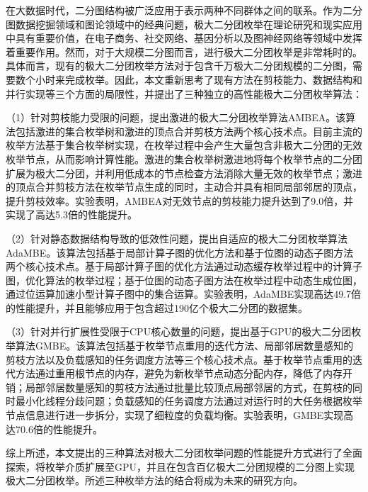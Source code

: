 \cleardoublepage
{}

在大数据时代，二分图结构被广泛应用于表示两种不同群体之间的联系。作为二分图数据挖掘领域和图论领域中的经典问题，极大二分团枚举在理论研究和现实应用中具有重要价值，在电子商务、社交网络、基因分析以及图神经网络等领域中发挥着重要作用。然而，对于大规模二分图而言，进行极大二分团枚举是非常耗时的。具体而言，现有的极大二分团枚举方法对于包含千万极大二分团规模的二分图，需要数个小时来完成枚举。因此，本文重新思考了现有方法在剪枝能力、数据结构和并行实现等三个方面的局限性，并提出了三种独立的高性能极大二分团枚举算法：

（1）针对剪枝能力受限的问题，提出激进的极大二分团枚举算法AMBEA。该算法包括激进的集合枚举树和激进的顶点合并剪枝方法两个核心技术点。目前主流的枚举方法基于集合枚举树实现，在枚举过程中会产生大量包含非极大二分团的无效枚举节点，从而影响计算性能。激进的集合枚举树激进地将每个枚举节点的二分团扩展为极大二分团，并利用低成本的节点检查方法消除大量无效的枚举节点；激进的顶点合并剪枝方法在枚举节点生成的同时，主动合并具有相同局部邻居的顶点，提升剪枝效率。实验表明，AMBEA对无效节点的剪枝能力提升达到了9.0倍，并实现了高达5.3倍的性能提升。

（2）针对静态数据结构导致的低效性问题，提出自适应的极大二分团枚举算法AdaMBE。该算法包括基于局部计算子图的优化方法和基于位图的动态子图方法两个核心技术点。基于局部计算子图的优化方法通过动态缓存枚举过程中的计算子图，优化算法的枚举过程；基于位图的动态子图方法在枚举过程中动态生成位图，通过位运算加速小型计算子图中的集合运算。实验表明，AdaMBE实现高达49.7倍的性能提升，并且能够应用于包含超过190亿个极大二分团的数据集。

（3）针对并行扩展性受限于CPU核心数量的问题，提出基于GPU的极大二分团枚举算法GMBE。该算法包括基于枚举节点重用的迭代方法、局部邻居数量感知的剪枝方法以及负载感知的任务调度方法等三个核心技术点。基于枚举节点重用的迭代方法通过重用根节点的内存，避免为新枚举节点动态分配内存，降低了内存开销；局部邻居数量感知的剪枝方法通过批量比较顶点局部邻居的方式，在剪枝的同时最小化线程分歧问题；负载感知的任务调度方法通过对运行时的大任务根据枚举节点信息进行进一步拆分，实现了细粒度的负载均衡。实验表明，GMBE实现高达70.6倍的性能提升。

综上所述，本文提出的三种算法对极大二分团枚举问题的性能提升方式进行了全面探索，将枚举介质扩展至GPU，并且在包含百亿极大二分团规模的二分图上实现极大二分团枚举。所述三种枚举方法的结合将成为未来的研究方向。


